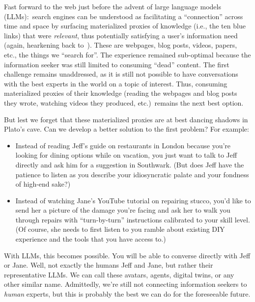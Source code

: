 \documentclass{article}
\begin{document}
Fast forward to the web just before the advent of large language models (LLMs):\ search engines can be understood as facilitating a ``connection'' across time and space by surfacing materialized proxies of knowledge (i.e., the ten blue links) that were {\it relevant}, thus potentially satisfying a user's information need (again, hearkening back to~\cite{Taylor62}).
These are webpages, blog posts, videos, papers, etc., the things we ``search for''.
The experience remained sub-optimal because the information seeker was still limited to consuming ``dead'' content.
The first challenge remains unaddressed, as it is still not possible to have conversations with the best experts in the world on a topic of interest.
Thus, consuming materialized proxies of their knowledge (reading the webpages and blog posts they wrote, watching videos they produced, etc.)\ remains the next best option.

But lest we forget that these materialized proxies are at best dancing shadows in Plato's cave.
Can we develop a better solution to the first problem?
For example:

\begin{itemize}

\item Instead of reading Jeff's guide on restaurants in London because you're looking for dining options while on vacation, you just want to talk to Jeff directly and ask him for a suggestion in Southwark.
(But does Jeff have the patience to listen as you describe your idiosyncratic palate and your fondness of high-end sake?)

\item Instead of watching Jane's YouTube tutorial on repairing stucco, you'd like to send her a picture of the damage you're facing and ask her to walk you through repairs with ``turn-by-turn'' instructions calibrated to your skill level.
(Of course, she needs to first listen to you ramble about existing DIY experience and the tools that you have access to.)

\end{itemize}

With LLMs, this becomes possible.
You will be able to converse directly with Jeff or Jane.
Well, not exactly the humans Jeff and Jane, but rather their representative LLMs.
We can call these avatars, agents, digital twins, or any other similar name.
Admittedly, we're still not connecting information seekers to {\it human} experts, but this is probably the best we can do for the foreseeable future.
\end{document}
